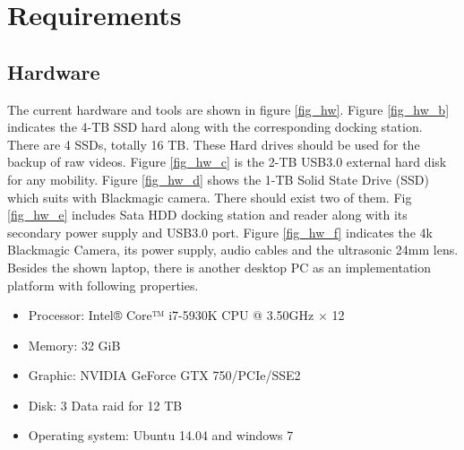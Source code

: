 \documentclass[[12pt,DIV14,BCOR12mm,a4paper,footexclude,headinclude,halfparskip-,twoside,openright,cleardoubleempty,idxtotoc,bibtotoc]{article}
\begin{document}
\section{Requirements}




\subsection{Hardware}

The current hardware and tools are shown in figure \ref{fig_hw}. 
Figure \ref{fig_hw_b} indicates the 4-TB SSD hard along with the corresponding docking station. There are 4 SSDs, totally 16 TB. These Hard drives should be used for the backup of raw videos. 
Figure \ref{fig_hw_c} is the 2-TB USB3.0 external hard disk for any mobility.  
Figure \ref{fig_hw_d} shows the 1-TB Solid State Drive (SSD) which suits with Blackmagic camera. There should exist two of them.
Fig \ref{fig_hw_e} includes Sata HDD docking station and reader along with its secondary power supply and USB3.0 port. 
Figure \ref{fig_hw_f} indicates the 4k Blackmagic Camera, its power supply, audio cables and the ultrasonic 24mm lens. 
Besides the shown laptop, there is another desktop PC as an implementation platform with following properties.

\begin{itemize}
	\item Processor: Intel® Core™ i7-5930K CPU @ 3.50GHz × 12 
	\item Memory: 32 GiB
	\item Graphic: NVIDIA GeForce GTX 750/PCIe/SSE2
	\item Disk: 3 Data raid for 12 TB
	\item Operating system: Ubuntu 14.04 and windows 7
\end{itemize}
\end{document}
